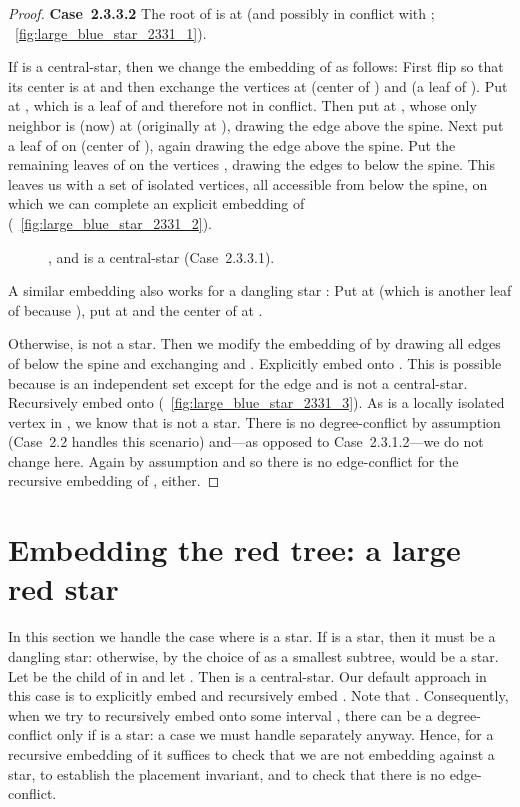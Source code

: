 \documentclass[11pt,a4paper,colorlinks=true,urlcolor=blue,citecolor=red]{article}
\theoremstyle{plain}
\newcommand{\case}[1]{\par\vspace{.5\baselineskip}\noindent\textbf{\sffamily Case~#1}}
\begin{document}
\begin{proof}
  \case{2.3.3.2} The root of  is at  (and possibly in
  conflict with ; \figurename~\ref{fig:large_blue_star_2331_1}).

  If  is a central-star, then we change the embedding of  as
  follows: First flip  so that its center is at  and then
  exchange the vertices at  (center  of ) and  (a leaf
  of ). Put  at , which is a leaf of  and therefore not
  in conflict. Then put  at , whose only neighbor is (now) at
   (originally at ), drawing the edge  above the spine.
  Next put a leaf of  on  (center  of ), again drawing
  the edge  above the spine. Put the remaining leaves of  on
  the vertices , drawing the edges to  below the spine.
  This leaves us with a set of isolated vertices, all accessible from
  below the spine, on which we can complete an explicit embedding of
   (\figurename~\ref{fig:large_blue_star_2331_2}).
\begin{figure}[htbp]
    \centering\hfil {}\hfil
    \hfil
    \hfil
    \caption{,  and  is a
      central-star (Case~2.3.3.1).\label{fig:large_blue_star_2331}}
  \end{figure}


  A similar embedding also works for a dangling star : Put  at
   (which is another leaf of  because ), put 
  at  and the center of  at .

  Otherwise,  is not a star. Then we modify the embedding of  by
  drawing all edges of  below the spine and exchanging  and
  . Explicitly embed  onto . This is possible
  because  is an independent set except for the edge
   and  is not a central-star. Recursively embed 
  onto  (\figurename~\ref{fig:large_blue_star_2331_3}). As
   is a locally isolated vertex in , we know that
   is not a star. There is no degree-conflict by
  assumption (Case~2.2 handles this scenario) and---as opposed to
  Case~2.3.1.2---we do not change  here. Again by assumption
   and so there is no edge-conflict for the
  recursive embedding of , either.
\end{proof}

\section{Embedding the red tree: a large red star}
\label{subsec:rec_large_red_star}
In this section we handle the case where  is a star. If  is a
star, then it must be a dangling star: otherwise, by the choice of 
as a smallest subtree,  would be a star. Let  be the child of 
in  and let . Then  is a central-star. Our default
approach in this case is to explicitly embed  and recursively embed
. Note that . Consequently, when we
try to recursively embed  onto some interval , there can be
a degree-conflict only if  is a star: a case we must handle
separately anyway. Hence, for a recursive embedding of  it suffices
to check that we are not embedding against a star, to establish the
placement invariant, and to check that there is no edge-conflict.
\end{document}
